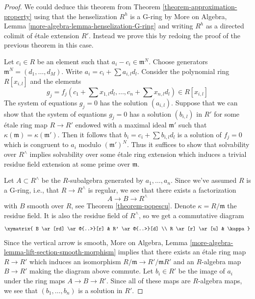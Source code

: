 \begin{proof}
We could deduce this theorem from Theorem \ref{theorem-approximation-property}
using that the henselization $R^h$ is a G-ring by
More on Algebra, Lemma \ref{more-algebra-lemma-henselization-G-ring}
and writing $R^h$ as a directed colimit of \'etale extension $R'$.
Instead we prove this by redoing the proof of the previous theorem
in this case.

\medskip\noindent
Let $c_i \in R$ be an element such that $a_i - c_i \in \mathfrak m^N$.
Choose generators $\mathfrak m^N = (d_1, \ldots, d_M)$.
Write $a_i = c_i + \sum a_{i, l} d_l$.
Consider the polynomial ring $R[x_{i, l}]$ and the elements
$$
g_j = f_j(c_1 + \sum x_{1, l} d_l , \ldots, c_n + \sum x_{n, l} d_l)
\in R[x_{i, l}]
$$
The system of equations $g_j = 0$ has the solution $(a_{i, l})$.
Suppose that we can show that the system of equations $g_j = 0$ has a solution $(b_{i, l})$ in $R'$
for some \'etale ring map $R \to R'$ endowed with a maximal ideal
$\mathfrak m'$ such that $\kappa(\mathfrak m) = \kappa(\mathfrak m')$.
Then it follows that $b_i = c_i + \sum b_{i, l}d_l$ is a solution
of $f_j = 0$ which is congruent to $a_i$ modulo $(\mathfrak m')^N$.
Thus it suffices to show that solvability over $R^\wedge$ implies
solvability over some \'etale ring extension which induces a trivial
residue field extension at some prime over $\mathfrak m$.

\medskip\noindent
Let $A \subset R^\wedge$ be the $R$-subalgebra generated by
$a_1, \ldots, a_n$. Since we've assumed $R$ is a G-ring, i.e.,
that $R \to R^\wedge$ is regular, we see that
there exists a factorization
$$
A \to B \to R^\wedge
$$
with $B$ smooth over $R$, see Theorem \ref{theorem-popescu}.
Denote $\kappa = R/\mathfrak m$ the residue field. It is also
the residue field of $R^\wedge$, so we get a commutative diagram
$$
\xymatrix{
B \ar[rd] \ar@{..>}[r] & R' \ar@{..>}[d] \\
R \ar[r] \ar[u] & \kappa
}
$$
Since the vertical arrow is smooth,
More on Algebra, Lemma \ref{more-algebra-lemma-lift-section-smooth-morphism}
implies that there exists an \'etale ring map $R \to R'$
which induces an isomorphism $R/\mathfrak m \to R'/\mathfrak mR'$
and an $R$-algebra map $B \to R'$ making the diagram above commute.
Let $b_i \in R'$ be the image of $a_i$ under the ring maps
$A \to B \to R'$. Since all of these maps are $R$-algebra
maps, we see that $(b_1, \ldots, b_n)$ is a solution in $R'$.
\end{proof}

